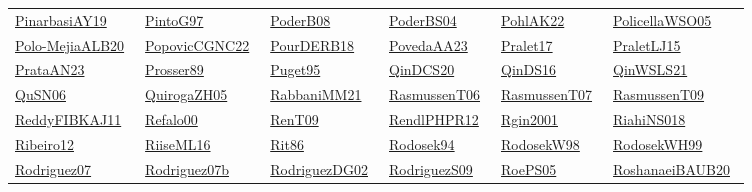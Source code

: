 \begin{longtable}{*{6}{l}}
\href{../works/PinarbasiAY19.pdf}{PinarbasiAY19}~\cite{PinarbasiAY19} & \href{../works/PintoG97.pdf}{PintoG97}~\cite{PintoG97} & \href{../works/PoderB08.pdf}{PoderB08}~\cite{PoderB08} & \href{../works/PoderBS04.pdf}{PoderBS04}~\cite{PoderBS04} & \href{../works/PohlAK22.pdf}{PohlAK22}~\cite{PohlAK22} & \href{../works/PolicellaWSO05.pdf}{PolicellaWSO05}~\cite{PolicellaWSO05}\\ 
\href{../works/Polo-MejiaALB20.pdf}{Polo-MejiaALB20}~\cite{Polo-MejiaALB20} & \href{../works/PopovicCGNC22.pdf}{PopovicCGNC22}~\cite{PopovicCGNC22} & \href{../works/PourDERB18.pdf}{PourDERB18}~\cite{PourDERB18} & \href{../works/PovedaAA23.pdf}{PovedaAA23}~\cite{PovedaAA23} & \href{../works/Pralet17.pdf}{Pralet17}~\cite{Pralet17} & \href{../works/PraletLJ15.pdf}{PraletLJ15}~\cite{PraletLJ15}\\ 
\href{../works/PrataAN23.pdf}{PrataAN23}~\cite{PrataAN23} & \href{../works/Prosser89.pdf}{Prosser89}~\cite{Prosser89} & \href{../works/Puget95.pdf}{Puget95}~\cite{Puget95} & \href{../works/QinDCS20.pdf}{QinDCS20}~\cite{QinDCS20} & \href{../works/QinDS16.pdf}{QinDS16}~\cite{QinDS16} & \href{../works/QinWSLS21.pdf}{QinWSLS21}~\cite{QinWSLS21}\\ 
\href{../works/QuSN06.pdf}{QuSN06}~\cite{QuSN06} & \href{../works/QuirogaZH05.pdf}{QuirogaZH05}~\cite{QuirogaZH05} & \href{../}{RabbaniMM21}~\cite{RabbaniMM21} & \href{../works/RasmussenT06.pdf}{RasmussenT06}~\cite{RasmussenT06} & \href{../works/RasmussenT07.pdf}{RasmussenT07}~\cite{RasmussenT07} & \href{../works/RasmussenT09.pdf}{RasmussenT09}~\cite{RasmussenT09}\\ 
\href{../works/ReddyFIBKAJ11.pdf}{ReddyFIBKAJ11}~\cite{ReddyFIBKAJ11} & \href{../works/Refalo00.pdf}{Refalo00}~\cite{Refalo00} & \href{../works/RenT09.pdf}{RenT09}~\cite{RenT09} & \href{../works/RendlPHPR12.pdf}{RendlPHPR12}~\cite{RendlPHPR12} & \href{../}{Rgin2001}~\cite{Rgin2001} & \href{../works/RiahiNS018.pdf}{RiahiNS018}~\cite{RiahiNS018}\\ 
\href{../works/Ribeiro12.pdf}{Ribeiro12}~\cite{Ribeiro12} & \href{../works/RiiseML16.pdf}{RiiseML16}~\cite{RiiseML16} & \href{../works/Rit86.pdf}{Rit86}~\cite{Rit86} & \href{../}{Rodosek94}~\cite{Rodosek94} & \href{../works/RodosekW98.pdf}{RodosekW98}~\cite{RodosekW98} & \href{../works/RodosekWH99.pdf}{RodosekWH99}~\cite{RodosekWH99}\\ 
\href{../works/Rodriguez07.pdf}{Rodriguez07}~\cite{Rodriguez07} & \href{../works/Rodriguez07b.pdf}{Rodriguez07b}~\cite{Rodriguez07b} & \href{../works/RodriguezDG02.pdf}{RodriguezDG02}~\cite{RodriguezDG02} & \href{../works/RodriguezS09.pdf}{RodriguezS09}~\cite{RodriguezS09} & \href{../works/RoePS05.pdf}{RoePS05}~\cite{RoePS05} & \href{../works/RoshanaeiBAUB20.pdf}{RoshanaeiBAUB20}~\cite{RoshanaeiBAUB20}\\ 

\end{longtable}
